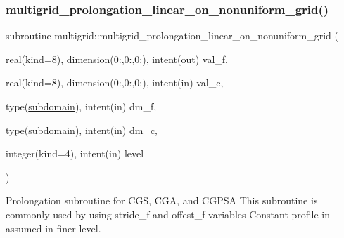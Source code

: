 \subsubsection{\texorpdfstring{multigrid\+\_\+prolongation\+\_\+linear\+\_\+on\+\_\+nonuniform\+\_\+grid()}{multigrid\_prolongation\_linear\_on\_nonuniform\_grid()}}
{\footnotesize\ttfamily subroutine multigrid\+::multigrid\+\_\+prolongation\+\_\+linear\+\_\+on\+\_\+nonuniform\+\_\+grid (\begin{DoxyParamCaption}\item[{real(kind=8), dimension(0\+:,0\+:,0\+:), intent(out)}]{val\+\_\+f,  }\item[{real(kind=8), dimension(0\+:,0\+:,0\+:), intent(in)}]{val\+\_\+c,  }\item[{type(\hyperlink{structgeometry_1_1subdomain}{subdomain}), intent(in)}]{dm\+\_\+f,  }\item[{type(\hyperlink{structgeometry_1_1subdomain}{subdomain}), intent(in)}]{dm\+\_\+c,  }\item[{integer(kind=4), intent(in)}]{level }\end{DoxyParamCaption})}



Prolongation subroutine for C\+GS, C\+GA, and C\+G\+P\+SA  This subroutine is commonly used by using stride\+\_\+f and offest\+\_\+f variables Constant profile in assumed in finer level. 


